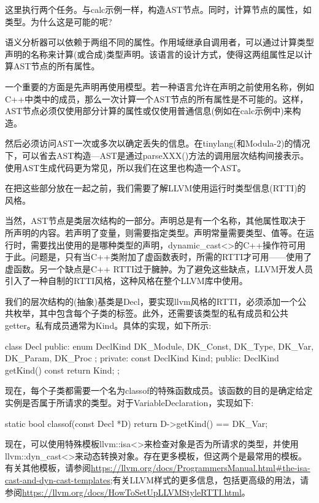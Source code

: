 这里执行两个任务。与calc示例一样，构造AST节点。同时，计算节点的属性，如类型。为什么这是可能的呢?

语义分析器可以依赖于两组不同的属性。作用域继承自调用者，可以通过计算类型声明的名称来计算(或合成)类型声明。该语言的设计方式，使得这两组属性足以计算AST节点的所有属性。

一个重要的方面是先声明再使用模型。若一种语言允许在声明之前使用名称，例如C++中类中的成员，那么一次计算一个AST节点的所有属性是不可能的。这样，AST节点必须仅使用部分计算的属性或仅使用普通信息(例如在calc示例中)来构造。

然后必须访问AST一次或多次以确定丢失的信息。在tinylang(和Modula-2)的情况下，可以省去AST构造—AST是通过parseXXX()方法的调用层次结构间接表示。使用AST生成代码更为常见，所以我们在这里也构造一个AST。

在把这些部分放在一起之前，我们需要了解LLVM使用运行时类型信息(RTTI)的风格。


当然，AST节点是类层次结构的一部分。声明总是有一个名称，其他属性取决于所声明的内容。若声明了变量，则需要指定类型。声明常量需要类型、值等。在运行时，需要找出使用的是哪种类型的声明，dynamic\_cast<>的C++操作符可用于此。问题是，只有当C++类附加了虚函数表时，所需的RTTI才可用——使用了虚函数。另一个缺点是C++ RTTI过于臃肿。为了避免这些缺点，LLVM开发人员引入了一种自制的RTTI风格，这种风格在整个LLVM库中使用。

我们的层次结构的(抽象)基类是Decl，要实现llvm风格的RTTI，必须添加一个公共枚举，其中包含每个子类的标签。此外，还需要该类型的私有成员和公共getter。私有成员通常为Kind。具体的实现，如下所示:

\begin{cpp}
class Decl {
public:
    enum DeclKind { DK_Module, DK_Const, DK_Type,
        DK_Var, DK_Param, DK_Proc };
private:
    const DeclKind Kind;
public:
    DeclKind getKind() const { return Kind; }
};
\end{cpp}

现在，每个子类都需要一个名为classof的特殊函数成员。该函数的目的是确定给定实例是否属于所请求的类型。对于VariableDeclaration，实现如下:

\begin{cpp}
static bool classof(const Decl *D) {
    return D->getKind() == DK_Var;
}
\end{cpp}

现在，可以使用特殊模板llvm::isa<>来检查对象是否为所请求的类型，并使用llvm::dyn\_cast<>来动态转换对象。存在更多模板，但这两个是最常用的模板。有关其他模板，请参阅\url{https://llvm.org/docs/ProgrammersManual.html#the-isa-cast-and-dyn-cast-templates};有关LLVM样式的更多信息，包括更高级的用法，请参阅\url{https://llvm.org/docs/HowToSetUpLLVMStyleRTTI.html}。

